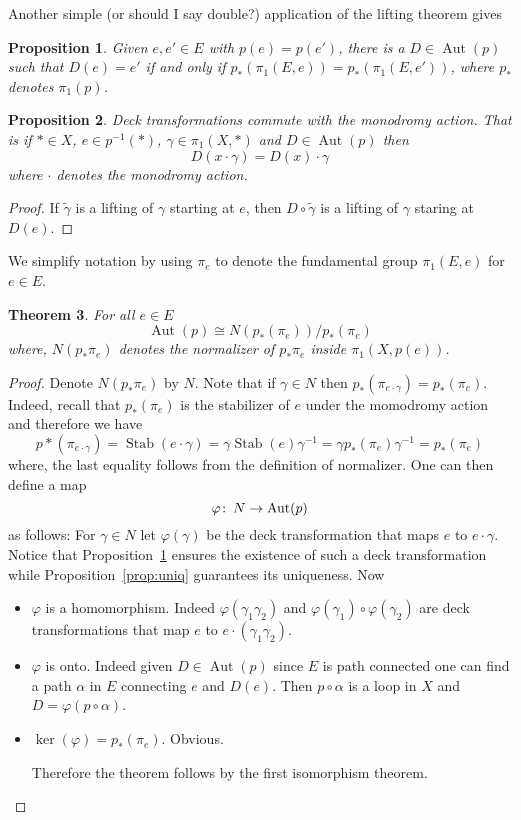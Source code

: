 \documentclass[12pt]{article}
\newtheorem{thm}{Theorem}
\newtheorem{prop}[thm]{Proposition}
\theoremstyle{definition}
\theoremstyle{remark}
\numberwithin{equation}{subsection}
\newcommand{\Gg}{\gamma}
\newcommand{\Gf}{\varphi}
\newcommand{\Au}{\operatorname{Aut}}
\def\co{\colon\thinspace}
\begin{document}
Another simple (or should I say double?) application of the lifting theorem gives

\begin{prop}\label{prop:exist}
  Given $e,e' \in E$ with $p(e)=p(e')$, there is a $D\in \Au(p)$ such that $D(e)=e'$ if and
  only if $p_*\left(\pi_1(E,e)\right)=p_*\left(\pi_1(E,e')\right)$, where
  $p_*$  denotes $\pi_1(p)$. 
\end{prop}


\begin{prop}
  Deck transformations commute with the monodromy action. That is if $*\in
  X$, $e\in p^{-1}(*)$, $\Gg\in \pi_1(X,*)$ and $D\in \Au(p)$ then 
$$D(x\cdot\Gg)=D(x)\cdot\Gg$$
where $\cdot$ denotes the monodromy action.
\end{prop}
\begin{proof}
  If $\tilde \Gg$ is a lifting of $\Gg$ starting at $e$, then
  $D\circ\tilde\Gg$  is a lifting of $\Gg$ staring at $D(e)$.
\end{proof}

We simplify notation by using $\pi_e$ to denote the fundamental group
$\pi_1(E,e)$ for $e\in E$.

\begin{thm} For all  $e\in E$ 
  $$\Au(p)\cong N\left(p_*(\pi_e)\right)/p_*(\pi_e)$$
where,  $ N(p_*\pi_e)$ denotes the normalizer of  $p_*\pi_e$ inside
$\pi_1\left(X,p(e)\right)$. 
\end{thm}

\begin{proof}
  Denote $N(p_*\pi_e)$ by $N$.  Note that if  $\Gg\in N$ then
  $p_*(\pi_{e\cdot\Gg})=p_*(\pi_e)$. Indeed, recall that
  $p_*(\pi_e)$ is the stabilizer of $e$ under the momodromy
  action and therefore we have  
 $$ p*(\pi_{e\cdot\Gg})=
 \operatorname{Stab}(e\cdot\Gg)=\Gg\operatorname{Stab}(e)\Gg^{-1}=\Gg p_*
 (\pi_e)\Gg^{-1}= p_* (\pi_e)$$
where, the last equality follows from the definition of normalizer.
One can then
define a map  
$$\Gf\co N\to \Au(p)$$
as follows: For $\Gg\in N$ let $\Gf(\Gg)$ be the deck transformation that
maps $e$ to $e\cdot\Gg$. Notice that Proposition~\ref{prop:exist} ensures
the existence of such a deck transformation while
Proposition~\ref{prop:uniq} guarantees its uniqueness. Now
\begin{itemize}
\item $\Gf$ is a homomorphism.\newline
Indeed $\Gf(\Gg_1\Gg_2)$ and  $\Gf(\Gg_1)\circ\Gf(\Gg_2)$ are deck
transformations that map $e$ to $e\cdot(\Gg_1\Gg_2)$.
\item $\Gf$ is onto.\newline
Indeed given $D\in \Au(p)$ since $E$ is path connected one can find a path
$\alpha$ in $E$ connecting $e$ and $D(e)$. Then $p\circ\alpha$ is a loop in
$X$ and $D=\Gf(p\circ\alpha)$.
\item $\ker(\Gf)=p_*(\pi_e)$. \newline
 Obvious.

Therefore the theorem follows by the first isomorphism theorem.
\end{itemize}
   
\end{proof}
\end{document}
